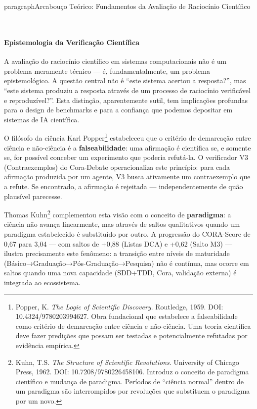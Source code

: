 ﻿%

\\\\paragraph{Arcabouço Teórico: Fundamentos da Avaliação de Raciocínio Científico}

\\\paragraph{Epistemologia da Verificação Científica}

A avaliação do raciocínio científico em sistemas computacionais não é um
problema meramente técnico — é, fundamentalmente, um problema epistemológico.
A questão central não é ``este sistema acertou a resposta?'', mas ``este
sistema produziu a resposta através de um processo de raciocínio verificável
e reproduzível?''. Esta distinção, aparentemente sutil, tem implicações
profundas para o design de benchmarks e para a confiança que podemos depositar
em sistemas de IA científica.

O filósofo da ciência Karl Popper\footnote{Popper, K. \textit{The Logic of
Scientific Discovery}. Routledge, 1959. DOI: 10.4324/9780203994627. Obra
fundacional que estabelece a falseabilidade como critério de demarcação
entre ciência e não-ciência. Uma teoria científica deve fazer predições que
possam ser testadas e potencialmente refutadas por evidência empírica.}
estabeleceu que o critério de demarcação entre ciência e não-ciência é a
\textbf{falseabilidade}: uma afirmação é científica se, e somente se, for
possível conceber um experimento que poderia refutá-la. O verificador V3
(Contraexemplos) do Cora-Debate operacionaliza este princípio: para cada
afirmação produzida por um agente, V3 busca ativamente um contraexemplo que
a refute. Se encontrado, a afirmação é rejeitada — independentemente de
quão plausível parecesse.

Thomas Kuhn\footnote{Kuhn, T.S. \textit{The Structure of Scientific
Revolutions}. University of Chicago Press, 1962. DOI: 10.7208/9780226458106.
Introduz o conceito de paradigma científico e mudança de paradigma. Períodos
de ``ciência normal'' dentro de um paradigma são interrompidos por revoluções
que substituem o paradigma por um novo.} complementou esta visão com o conceito
de \textbf{paradigma}: a ciência não avança linearmente, mas através de
saltos qualitativos quando um paradigma estabelecido é substituído por outro.
A progressão do CORA-Score de 0,67 para 3,04 — com saltos de +0,88 (Listas
DCA) e +0,62 (Salto M3) — ilustra precisamente este fenômeno: a transição
entre níveis de maturidade (Básico→Graduação→Pós-Graduação→Pesquisa) não é
contínua, mas ocorre em saltos quando uma nova capacidade (SDD+TDD, Cora,
validação externa) é integrada ao ecossistema.

